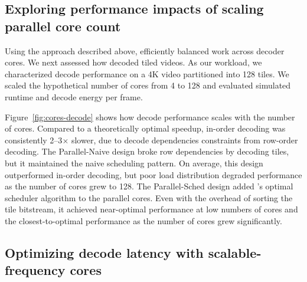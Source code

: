 \subsection{Exploring performance impacts of scaling parallel core count}
\label{subsec:parallel-design-space}
Using the approach described above, \nameArch efficiently balanced work across decoder cores.  We next assessed how \nameArch decoded tiled videos.
As our workload, we characterized decode performance on a 4K video partitioned into 128 tiles.
We scaled the hypothetical number of cores from 4 to 128 and evaluated simulated runtime and decode energy per frame.


Figure~\ref{fig:cores-decode} shows how decode performance scales with the number of cores.
Compared to a theoretically optimal speedup, in-order decoding was consistently 2--3$\times$ slower, due to decode dependencies constraints from row-order decoding.
The Parallel-Naive design broke row dependencies by decoding tiles, but it maintained the naive scheduling pattern.
On average, this design outperformed in-order decoding, but poor load distribution degraded performance as the number of cores grew to 128.
The Parallel-Sched design added \nameArch's optimal scheduler algorithm to the parallel cores.
Even with the overhead of sorting the tile bitstream, it achieved near-optimal performance at low numbers of cores and the closest-to-optimal performance as the number of cores grew significantly.

\dvfsEnergySpeedup

\subsection{Optimizing decode latency with scalable-frequency cores}
\label{subsec:hetero-cores}

